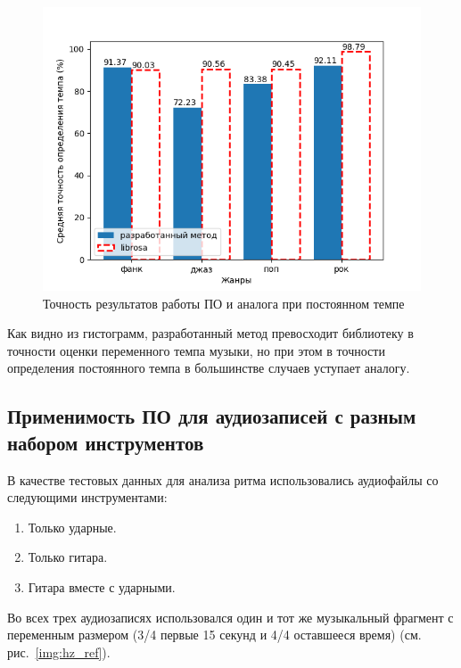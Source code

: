 \begin{figure}[h]
	\centering
	\includegraphics[scale=0.9]{../graphs/const_tempo_librosa.png}
	\caption{Точность результатов работы ПО и аналога при постоянном темпе}
	\label{img:tempo_librosa_const}
\end{figure}

\clearpage

Как видно из гистограмм, разработанный метод превосходит библиотеку в точности оценки переменного темпа музыки, но при этом в точности определения постоянного темпа в большинстве случаев уступает аналогу.

\subsection{Применимость ПО для аудиозаписей с разным набором инструментов}

В качестве тестовых данных для анализа ритма использовались аудиофайлы со следующими инструментами:
 
\begin{enumerate}
	\item Только ударные.
	\item Только гитара.
	\item Гитара вместе с ударными.
\end{enumerate}

Во всех трех аудиозаписях использовался один и тот же музыкальный фрагмент с переменным размером (3/4 первые 15 секунд и 4/4 оставшееся время) (см. рис.~\ref{img:hz_ref}).

